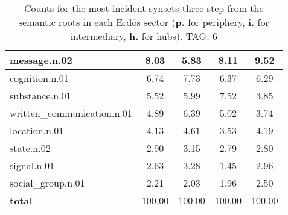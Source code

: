 \begin{table}[h!]
\begin{center}
\begin{tabular}{| l || c | c | c | c |}
message.n.02 & 8.03  & 5.83  & 8.11  & 9.52 \\\hline
cognition.n.01 & 6.74  & 7.73  & 6.37  & 6.29 \\\hline
substance.n.01 & 5.52  & 5.99  & 7.52  & 3.85 \\\hline
written\_communication.n.01 & 4.89  & 6.39  & 5.02  & 3.74 \\\hline
location.n.01 & 4.13  & 4.61  & 3.53  & 4.19 \\\hline
state.n.02 & 2.90  & 3.15  & 2.79  & 2.80 \\\hline
signal.n.01 & 2.63  & 3.28  & 1.45  & 2.96 \\\hline
social\_group.n.01 & 2.21  & 2.03  & 1.96  & 2.50 \\\hline\hline
{{\bf total}} & 100.00  & 100.00  & 100.00  & 100.00 \\\hline
\end{tabular}
\caption{Counts for the most incident synsets three step from the semantic roots in each Erd\"os sector ({\bf p.} for periphery, {\bf i.} for intermediary, {\bf h.} for hubs). TAG: 6}
\end{center}
\end{table}